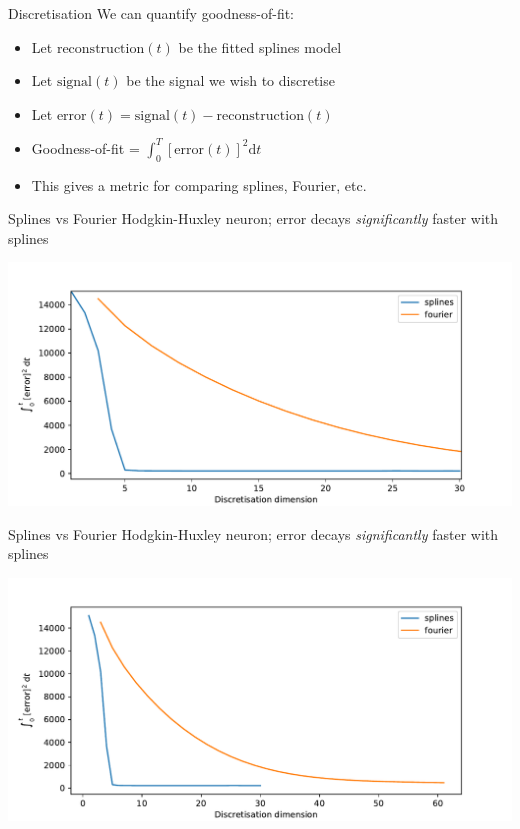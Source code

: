 \documentclass[presentation]{beamer}
\begin{document}
\begin{frame}[<+->][label={sec:orgbf84cea}]{Discretisation}
We can quantify goodness-of-fit:
\vfill
\begin{itemize}
\item Let \(\mathrm{reconstruction}(t)\) be the fitted splines model
\item Let \(\mathrm{signal}(t)\) be the signal we wish to discretise
\item Let \(\mathrm{error}(t) = \mathrm{signal}(t) - \mathrm{reconstruction}(t)\)
\item Goodness-of-fit = \(\int_0^T\left[\mathrm{error}(t)\right]^2\mathrm{d}t\)
\item This gives a metric for comparing splines, Fourier, etc.
\end{itemize}
\end{frame}

\begin{frame}[label={sec:orga629114}]{Splines vs Fourier}
Hodgkin-Huxley neuron; error decays \emph{significantly} faster with splines
\begin{center}
\includegraphics[width=.9\linewidth]{./HHerror2.pdf}
\end{center}
\end{frame}

\begin{frame}[label={sec:org4400509}]{Splines vs Fourier}
Hodgkin-Huxley neuron; error decays \emph{significantly} faster with splines
\begin{center}
\includegraphics[width=.9\linewidth]{./HHerror.pdf}
\end{center}
\end{frame}
\end{document}
